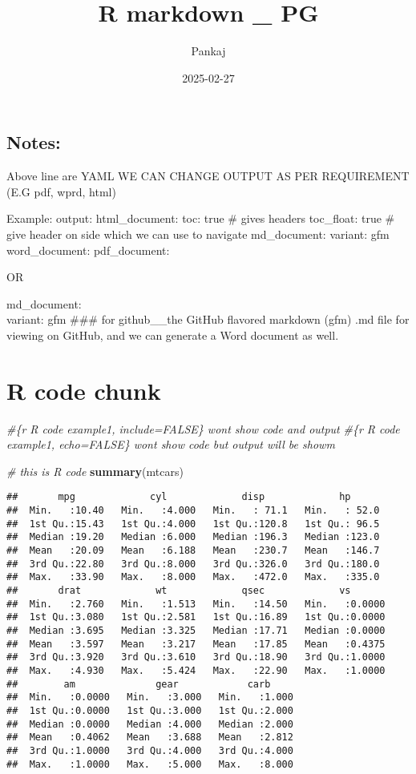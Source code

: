 \documentclass[
]{article}
\title{R markdown \_ PG}
\author{Pankaj}
\date{2025-02-27}
\newenvironment{Shaded}{\begin{snugshade}}{\end{snugshade}}
\newcommand{\CommentTok}[1]{\textcolor[rgb]{0.56,0.35,0.01}{\textit{#1}}}
\newcommand{\FunctionTok}[1]{\textcolor[rgb]{0.13,0.29,0.53}{\textbf{#1}}}
\newcommand{\NormalTok}[1]{#1}
\begin{document}
\maketitle

\subsection{Notes:}\label{notes}

Above line are YAML WE CAN CHANGE OUTPUT AS PER REQUIREMENT (E.G pdf,
wprd, html)

Example: output: html\_document: toc: true \# gives headers toc\_float:
true \# give header on side which we can use to navigate md\_document:
variant: gfm word\_document: pdf\_document:

OR

md\_document:\\
variant: gfm \#\#\# for github\_\_the GitHub flavored markdown (gfm) .md
file for viewing on GitHub, and we can generate a Word document as well.

\section{R code chunk}\label{r-code-chunk}

\begin{Shaded}
\begin{Highlighting}[]
\CommentTok{\#\{r R  code example1, include=FALSE\}   wont show code and output}
\CommentTok{\#\{r R  code example1, echo=FALSE\}      wont show code but output will be showm}

\CommentTok{\# this is R code}
\FunctionTok{summary}\NormalTok{(mtcars)}
\end{Highlighting}
\end{Shaded}

\begin{verbatim}
##       mpg             cyl             disp             hp       
##  Min.   :10.40   Min.   :4.000   Min.   : 71.1   Min.   : 52.0  
##  1st Qu.:15.43   1st Qu.:4.000   1st Qu.:120.8   1st Qu.: 96.5  
##  Median :19.20   Median :6.000   Median :196.3   Median :123.0  
##  Mean   :20.09   Mean   :6.188   Mean   :230.7   Mean   :146.7  
##  3rd Qu.:22.80   3rd Qu.:8.000   3rd Qu.:326.0   3rd Qu.:180.0  
##  Max.   :33.90   Max.   :8.000   Max.   :472.0   Max.   :335.0  
##       drat             wt             qsec             vs        
##  Min.   :2.760   Min.   :1.513   Min.   :14.50   Min.   :0.0000  
##  1st Qu.:3.080   1st Qu.:2.581   1st Qu.:16.89   1st Qu.:0.0000  
##  Median :3.695   Median :3.325   Median :17.71   Median :0.0000  
##  Mean   :3.597   Mean   :3.217   Mean   :17.85   Mean   :0.4375  
##  3rd Qu.:3.920   3rd Qu.:3.610   3rd Qu.:18.90   3rd Qu.:1.0000  
##  Max.   :4.930   Max.   :5.424   Max.   :22.90   Max.   :1.0000  
##        am              gear            carb      
##  Min.   :0.0000   Min.   :3.000   Min.   :1.000  
##  1st Qu.:0.0000   1st Qu.:3.000   1st Qu.:2.000  
##  Median :0.0000   Median :4.000   Median :2.000  
##  Mean   :0.4062   Mean   :3.688   Mean   :2.812  
##  3rd Qu.:1.0000   3rd Qu.:4.000   3rd Qu.:4.000  
##  Max.   :1.0000   Max.   :5.000   Max.   :8.000
\end{verbatim}
\end{document}
